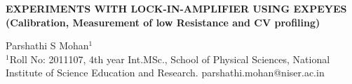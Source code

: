 \documentclass{article}
\begin{document}
\clearpage




\normalsize 
 

  



\newpage

\begin{center}
    \large{\textbf{EXPERIMENTS WITH LOCK-IN-AMPLIFIER USING EXPEYES
(Calibration, Measurement of low Resistance and CV profiling)}}

    \vspace{0.5 cm}
    \large{Parshathi S Mohan$^1$}
\\
    \normalsize{$^1$Roll No: 2011107, 4th year Int.MSc., School of Physical Sciences, National Institute of Science Education and Research. parshathi.mohan@niser.ac.in}
\end{center}

\end{document}

